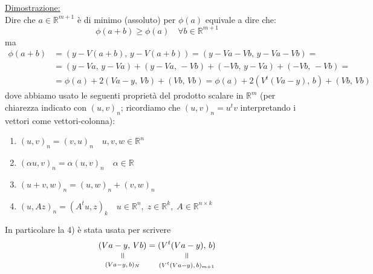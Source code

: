 \documentclass[12pt,a4paper]{article}
\newcommand{\verteq}{\rotatebox{90}{$\,=$}}
\newcommand{\equalto}[2]{\underset{\scriptstyle\overset{\mkern4mu\verteq}{#2}}{#1}}
\begin{document}
\underline{Dimostrazione:}\\
Dire che $a \in \mathbb{R}^{m+1}$ è di minimo (assoluto) per $\phi(a)$ equivale a dire che:
\[
	\phi(a+b) \geq \phi(a) \quad \forall b \in \mathbb{R}^{m+1}
\]
ma
\[ \begin{split}
\phi(a+b) & = (y-V(a+b),\, y-V(a+b)) = 
 (y-Va-Vb, \, y-Va-Vb) = \\
& = (y-Va,\, y-Va) + (y-Va, \, -Vb) + (-Vb, \, y-Va) + (-Vb, \, -Vb) = \\
& = \phi(a) + 2(Va-y, \, Vb) + (Vb, \, Vb) = \phi(a) +2(V^t(Va-y), \, b) + (Vb, \, Vb)
\end{split} \]
dove abbiamo usato le seguenti proprietà del prodotto scalare in $\mathbb{R}^{m}$ (per chiarezza indicato con $(u,v)_n$; ricordiamo che $(u,v)_n=u^tv$ interpretando i vettori come vettori-colonna):
\begin{enumerate}
\item $(u,v)_n=(v,u)_n \quad u,v,w \in \mathbb{R}^{n}$
\item $(\alpha u,v)_n= \alpha(u,v)_n \quad \alpha \in \mathbb{R}$
\item $(u+v,w)_n=(u,w)_n+(v,w)_n$
\item $(u,Az)_n = (A^tu,z)_k \quad u \in \mathbb{R}^{n}, \; z \in \mathbb{R}^{k}, \; A \in \mathbb{R}^{n \times k}$
\end{enumerate}
In particolare la 4) è stata usata per scrivere
\[
    \equalto{(Va-y, \, Vb)}{(Va-y, \, b)_N} = \equalto{(V^t(Va-y), \, b)}{(V^t(Va-y), \, b)_{m+1}}
\]
\end{document}
